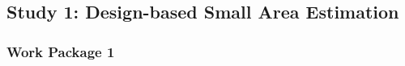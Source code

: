 \subsection{Study 1: Design-based Small Area Estimation}


%
% 


\subsubsection{Work Package 1} %




